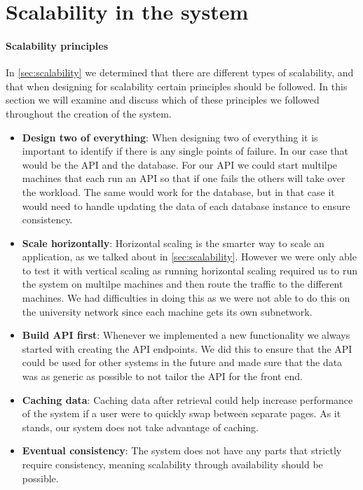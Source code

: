 \section{Scalability in the system}
\paragraph{Scalability principles}
In \autoref{sec:scalability} we determined that there are different types of scalability, and that when designing for scalability certain principles should be followed.
In this section we will examine and discuss which of these principles we followed throughout the creation of the system.

\begin{itemize}
    \item \textbf{Design two of everything}: When designing two of everything it is important to identify if there is any single points of failure.
    In our case that would be the API and the database.
    For our API we could start multilpe machines that each run an API so that if one fails the others will take over the workload.
    The same would work for the database, but in that case it would need to handle updating the data of each database instance to ensure consistency.
    \item \textbf{Scale horizontally}: Horizontal scaling is the smarter way to scale an application, as we talked about in \autoref{sec:scalability}.
    However we were only able to test it with vertical scaling as running horizontal scaling required us to run the system on multilpe machines and then route the traffic to the different machines.
    We had difficulties in doing this as we were not able to do this on the university network since each machine gets its own subnetwork.
    \item \textbf{Build API first}: Whenever we implemented a new functionality we always started with creating the API endpoints.
    We did this to ensure that the API could be used for other systems in the future and made sure that the data was as generic as possible to not tailor the API for the front end. 
    \item \textbf{Caching data}: Caching data after retrieval could help increase performance of the system if a user were to quickly swap between separate pages. 
    As it stands, our system does not take advantage of caching.
    \item \textbf{Eventual consistency}: The system does not have any parts that strictly require consistency, meaning scalability through availability should be possible. 

\end{itemize}
